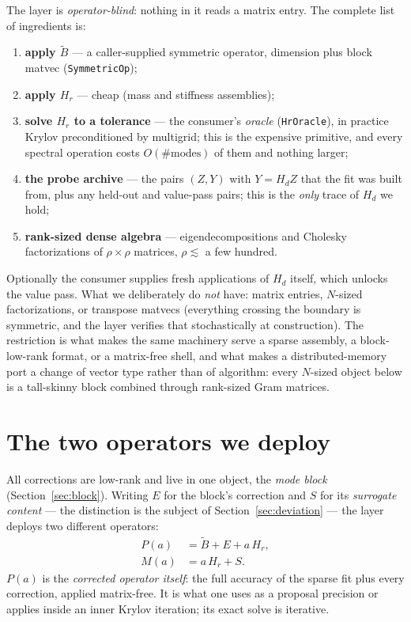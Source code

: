 \documentclass[11pt]{article}
\newcommand{\Bt}{\widetilde{B}}
\newcommand{\Hd}{H_d}
\newcommand{\Hr}{H_r}
\begin{document}
\medskip
\noindent
The layer is \emph{operator-blind}: nothing in it reads a matrix entry.
The complete list of ingredients is:
\begin{enumerate}
  \item \textbf{apply $\Bt$} --- a caller-supplied symmetric operator,
    dimension plus block matvec (\texttt{SymmetricOp});
  \item \textbf{apply $\Hr$} --- cheap (mass and stiffness assemblies);
  \item \textbf{solve $\Hr$ to a tolerance} --- the consumer's
    \emph{oracle} (\texttt{HrOracle}), in practice Krylov preconditioned by
    multigrid; this is the expensive primitive, and every spectral
    operation costs $O(\#\text{modes})$ of them and nothing larger;
  \item \textbf{the probe archive} --- the pairs $(Z, Y)$ with
    $Y = \Hd Z$ that the fit was built from, plus any held-out and
    value-pass pairs; this is the \emph{only} trace of $\Hd$ we hold;
  \item \textbf{rank-sized dense algebra} --- eigendecompositions and
    Cholesky factorizations of $\rho \times \rho$ matrices,
    $\rho \lesssim$ a few hundred.
\end{enumerate}
Optionally the consumer supplies fresh applications of $\Hd$ itself, which
unlocks the value pass. What we deliberately do \emph{not} have: matrix
entries, $N$-sized factorizations, or transpose matvecs (everything
crossing the boundary is symmetric, and the layer verifies that
stochastically at construction). The restriction is what makes the same
machinery serve a sparse assembly, a block-low-rank format, or a
matrix-free shell, and what makes a distributed-memory port a change of
vector type rather than of algorithm: every $N$-sized object below is a
tall-skinny block combined through rank-sized Gram matrices.

\section{The two operators we deploy}
\label{sec:two-operators}

All corrections are low-rank and live in one object, the \emph{mode block}
(Section~\ref{sec:block}). Writing $E$ for the block's correction and $S$
for its \emph{surrogate content} --- the distinction is the subject of
Section~\ref{sec:deviation} --- the layer deploys two different operators:
\begin{align}
  P(a) &= \Bt + E + a\,\Hr,
  \label{eq:P}\\
  M(a) &= a\,\Hr + S.
  \label{eq:M}
\end{align}
$P(a)$ is the \emph{corrected operator itself}: the full accuracy of the
sparse fit plus every correction, applied matrix-free. It is what one uses
as a proposal precision or applies inside an inner Krylov iteration; its
exact solve is iterative.
\end{document}
